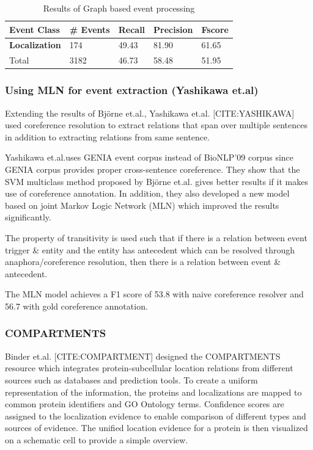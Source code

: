 \begin{table}[h]
\centering
\begin{tabular}{|l|l|l|l|l|}
\hline
\textbf{Event Class} & \textbf{\# Events} & \textbf{Recall} & \textbf{Precision} & \textbf{Fscore} \\ \hline
\textbf{Localization} & 174 & 49.43 & 81.90 & 61.65 \\
Total & 3182 & 46.73 & 58.48 & 51.95\\ \hline
\end{tabular}
\caption{Results of Graph based event processing}
\end{table}

\subsubsection*{Using MLN for event extraction (Yashikawa et.al)}

Extending the results of Björne et.al., Yashikawa et.al. [CITE:YASHIKAWA] used coreference resolution to extract relations that span over multiple sentences in 
addition to extracting relations from same sentence. 

Yashikawa et.al.uses GENIA event corpus instead of BioNLP'09 corpus since GENIA corpus provides proper cross-sentence coreference. They show that the SVM multiclass method proposed by Bj{\"o}rne et.al. gives better results if it makes use of coreference annotation. In addition, they also developed a new model based on joint Markov Logic Network (MLN) which improved the results significantly.

The property of transitivity is used such that if there is a relation between event trigger \& entity and the entity has antecedent which can be resolved through anaphora/coreference resolution, then there is a relation between event \& antecedent.


The MLN model achieves a F1 score of 53.8 with naive coreference resolver and 56.7 with gold coreference annotation. 

\subsubsection*{COMPARTMENTS}


Binder et.al. [CITE:COMPARTMENT] designed the COMPARTMENTS resource which integrates protein-subcellular location relations from different sources such as databases and prediction tools. To create a uniform representation of the information, the proteins and localizations are mapped to common protein identifiers and GO Ontology terms. Confidence scores are assigned to the localization evidence to enable comparison of different types and sources of evidence. The unified location evidence for a protein is then visualized on a schematic cell to  provide a simple overview.

